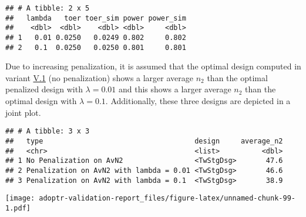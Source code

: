 \documentclass[]{book}
\begin{document}
\begin{verbatim}
## # A tibble: 2 x 5
##   lambda   toer toer_sim power power_sim
##    <dbl>  <dbl>    <dbl> <dbl>     <dbl>
## 1   0.01 0.0250   0.0249 0.802     0.802
## 2   0.1  0.0250   0.0250 0.801     0.801
\end{verbatim}

Due to increasing penalization, it is assumed that the optimal design
computed in variant \protect\hyperlink{variantV_1}{V.1} (no penalization) shows a larger
average \(n_2\) than the optimal penalized design with \(\lambda = 0.01\)
and this shows a larger average \(n_2\) than the optimal design
with \(\lambda = 0.1\).
Additionally, these three designs are depicted in a joint plot.

\begin{verbatim}
## # A tibble: 3 x 3
##   type                                    design     average_n2
##   <chr>                                   <list>          <dbl>
## 1 No Penalization on AvN2                 <TwStgDsg>       47.6
## 2 Penalization on AvN2 with lambda = 0.01 <TwStgDsg>       46.6
## 3 Penalization on AvN2 with lambda = 0.1  <TwStgDsg>       38.9
\end{verbatim}

\texttt{[image: adoptr-validation-report\_files/figure-latex/unnamed-chunk-99-1.pdf]}


\end{document}
